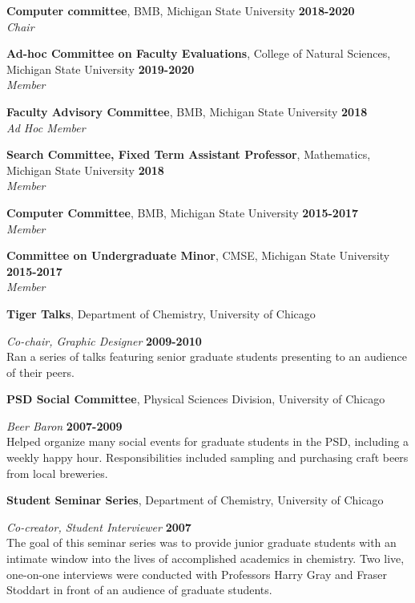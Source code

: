 \documentclass[margin,line]{res}
\begin{document}
\begin{resume}
        {\bf Computer committee}, BMB, Michigan State University \hfill {\bf 2018-2020}\\
        {\emph {Chair}}
     
        {\bf Ad-hoc Committee on Faculty Evaluations}, College of Natural Sciences, Michigan State University \hfill {\bf 2019-2020}\\
        {\emph {Member}}

        {\bf Faculty Advisory Committee}, BMB, Michigan State University \hfill {\bf 2018}\\
        {\emph {Ad Hoc Member}}

        {\bf Search Committee, Fixed Term Assistant Professor}, Mathematics, Michigan State University \hfill {\bf 2018}\\
        {\emph {Member}}
        
        {\bf Computer Committee}, BMB, Michigan State University \hfill {\bf 2015-2017}\\
        {\emph {Member}}

        {\bf Committee on Undergraduate Minor}, CMSE, Michigan State University \hfill {\bf 2015-2017}\\
        {\emph {Member}}

{\bf Tiger Talks}, Department of Chemistry, University of Chicago

\vspace{-.3cm}
{\em Co-chair, Graphic Designer} \hfill {\bf 2009-2010}\\
Ran a series of talks featuring senior graduate students presenting to an audience of their peers.

{\bf PSD Social Committee}, Physical Sciences Division, University of Chicago

\vspace{-.3cm}
{\em Beer Baron} \hfill {\bf 2007-2009}\\
Helped organize many social events for graduate students in the PSD, including a weekly happy
hour. Responsibilities included sampling and purchasing craft beers from local breweries.

{\bf Student Seminar Series}, Department of Chemistry, University of Chicago

\vspace{-.3cm}
{\em Co-creator, Student Interviewer} \hfill {\bf 2007}\\
The goal of this seminar series was to provide junior graduate students with an intimate window into
the lives of accomplished academics in chemistry. Two live, one-on-one interviews were conducted
with Professors Harry Gray and Fraser Stoddart in front of an audience of graduate students.


\end{resume}
\end{document}
